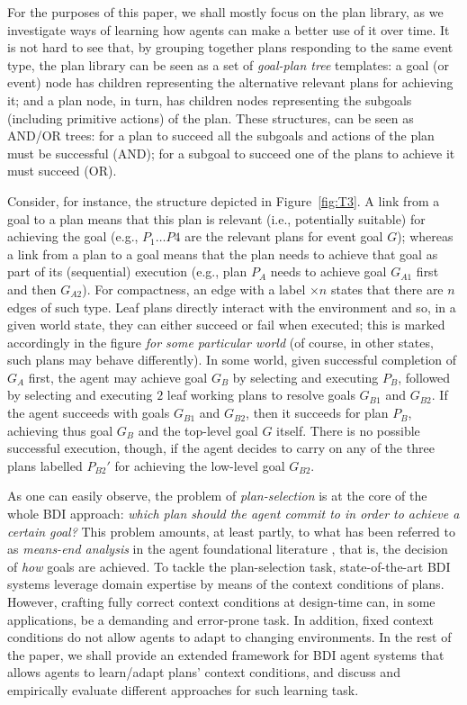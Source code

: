 For the purposes of this paper, we shall mostly focus on the plan library, as we
investigate ways of learning how agents can make a better use of it over time.
It is not hard to see that, by grouping together plans responding to the same
event type, the plan library can be seen as a set of \emph{goal-plan tree}
templates: a goal (or event) node has children representing the alternative
relevant plans for achieving it; and a plan node, in turn, has children nodes
representing the subgoals (including primitive actions) of the plan.
These structures, can be seen as AND/OR trees: for a plan to succeed all the
subgoals and actions of the plan must be successful (AND); for a subgoal to
succeed one of the plans to achieve it must succeed (OR).

Consider, for instance, the structure depicted in
Figure~\ref{fig:T3}.
A link from a goal to a plan means that this plan is relevant (i.e., potentially
suitable) for achieving the goal (e.g., $P_1 \ldots P4$ are the relevant
plans for event goal $G$); whereas a link from a plan to a goal means that the
plan needs to achieve that goal as part of its (sequential) execution (e.g., plan
$P_A$ needs to achieve goal $G_{A1}$ first and then $G_{A2}$).
For compactness, an edge with a label $\times n$ states that there are $n$ edges
of such type.
Leaf plans directly interact with the environment and so, in a given world state,
they can either succeed or fail when executed; this is marked accordingly in the
figure \emph{for some particular world} (of course, in other states, such plans
may behave differently).
In some world, given successful completion of $G_A$ first, the agent may achieve goal $G_B$ by selecting and
executing $P_B$, followed by selecting and executing $2$ leaf working plans to
resolve goals $G_{B1}$ and $G_{B2}$. If the agent succeeds with goals $G_{B1}$
and $G_{B2}$, then it succeeds for plan $P_B$, achieving thus goal $G_B$ and the
top-level goal $G$ itself. There is no possible successful execution, though, if
the agent decides to carry on any of the three plans labelled $P_{B2}'$ for
achieving the low-level goal $G_{B2}$.

As one can easily observe, the problem of \textit{plan-selection} is at the core
of the whole BDI approach:
\emph{which plan should the agent commit to in order to achieve a certain goal?}
This problem amounts, at least partly, to what has been referred to as
\emph{means-end analysis} in the agent foundational literature
\cite{Pollack92-IRMA,Bratman88}, that is, the decision of \textit{how} goals are
achieved.
To tackle the plan-selection task, state-of-the-art BDI systems leverage domain
expertise by means of the context conditions of plans. However, crafting fully
correct context conditions at design-time can, in some applications, be a
demanding and error-prone task. In addition, fixed context conditions do not
allow agents to adapt to changing environments.
In the rest of the paper, we shall provide an extended framework for BDI agent
systems that allows agents to learn/adapt plans' context conditions, and discuss
and empirically evaluate different approaches for such learning task.


